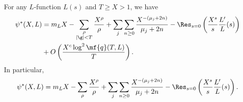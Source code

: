 \documentclass[12pt]{article}
\begin{document}
      \begin{theorem*}
        For any \(L\)-function \(L(s)\) and \(T \ge X > 1\), we have
        \begin{align*}
          \psi^{\ast}(X,L) &= m_{L}X-\sum_{\substack{\rho \\ |\g| < T}}\frac{X^{\rho}}{\rho}+\sum_{j}\sum_{n \ge 0}\frac{X^{-(\mu_{j}+2n)}}{\mu_{j}+2n}-\Res_{s = 0}\left(\frac{X^{s}}{s}\frac{L'}{L}(s)\right) \\
          &+ O\left(\frac{X^{c}\log^{2}\mf{q}(T,L)}{T}\right).
        \end{align*}
        In particular,
        \[
          \psi^{\ast}(X,L) = m_{L}X-\sum_{\rho }\frac{X^{\rho}}{\rho}+\sum_{j}\sum_{n \ge 0}\frac{X^{-(\mu_{j}+2n)}}{\mu_{j}+2n}-\Res_{s = 0}\left(\frac{X^{s}}{s}\frac{L'}{L}(s)\right).
        \]
      \end{theorem*}
\end{document}
